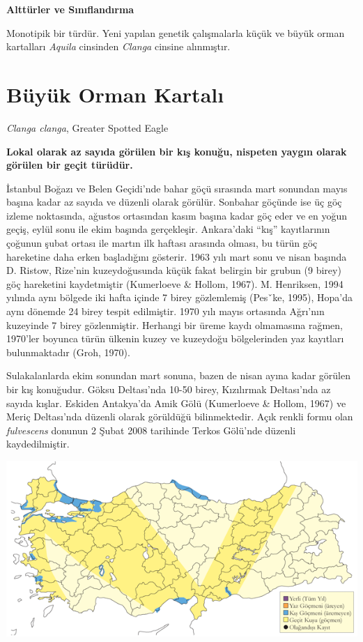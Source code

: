 \documentclass[
  a4paper,
  DIV=11,
  numbers=noendperiod]{scrreprt}
\begin{document}
\textbf{Alttürler ve Sınıflandırma}

Monotipik bir türdür. Yeni yapılan genetik çalışmalarla küçük ve büyük
orman kartalları \emph{Aquila} cinsinden \emph{Clanga} cinsine
alınmıştır.

\section{Büyük Orman Kartalı}\label{buxfcyuxfck-orman-kartalux131}

\emph{Clanga clanga}, Greater Spotted Eagle

\textbf{Lokal olarak az sayıda görülen bir kış konuğu, nispeten yaygın
olarak görülen bir geçit türüdür.}

İstanbul Boğazı ve Belen Geçidi'nde bahar göçü sırasında mart sonundan
mayıs başına kadar az sayıda ve düzenli olarak görülür. Sonbahar göçünde
ise üç göç izleme noktasında, ağustos ortasından kasım başına kadar göç
eder ve en yoğun geçiş, eylül sonu ile ekim başında gerçekleşir.
Ankara'daki ``kış'' kayıtlarının çoğunun şubat ortası ile martın ilk
haftası arasında olması, bu türün göç hareketine daha erken başladığını
gösterir. 1963 yılı mart sonu ve nisan başında D. Ristow, Rize'nin
kuzeydoğusunda küçük fakat belirgin bir grubun (9 birey) göç hareketini
kaydetmiştir (Kumerloeve \& Hollom, 1967). M. Henriksen, 1994 yılında
aynı bölgede iki hafta içinde 7 birey gözlemlemiş (Pesˇke, 1995),
Hopa'da aynı dönemde 24 birey tespit edilmiştir. 1970 yılı mayıs
ortasında Ağrı'nın kuzeyinde 7 birey gözlenmiştir. Herhangi bir üreme
kaydı olmamasına rağmen, 1970'ler boyunca türün ülkenin kuzey ve
kuzeydoğu bölgelerinden yaz kayıtları bulunmaktadır (Groh, 1970).

Sulakalanlarda ekim sonundan mart sonuna, bazen de nisan ayına kadar
görülen bir kış konuğudur. Göksu Deltası'nda 10-50 birey, Kızılırmak
Deltası'nda az sayıda kışlar. Eskiden Antakya'da Amik Gölü (Kumerloeve
\& Hollom, 1967) ve Meriç Deltası'nda düzenli olarak görüldüğü
bilinmektedir. Açık renkli formu olan \emph{fulvescens} donunun 2 Şubat
2008 tarihinde Terkos Gölü'nde düzenli kaydedilmiştir.

\includegraphics{images/harita_Page_092.png}
\end{document}
